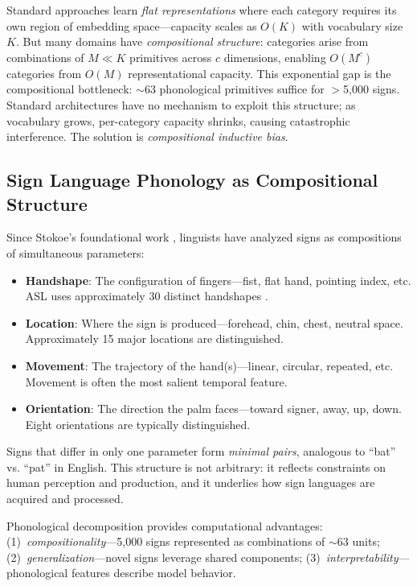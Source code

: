 \documentclass[runningheads]{llncs}
\begin{document}
Standard approaches learn \textit{flat representations} where each category requires its own region of embedding space---capacity scales as $O(K)$ with vocabulary size $K$. But many domains have \textit{compositional structure}: categories arise from combinations of $M \ll K$ primitives across $c$ dimensions, enabling $O(M^c)$ categories from $O(M)$ representational capacity. This exponential gap is the compositional bottleneck: $\sim$63 phonological primitives suffice for $>$5,000 signs. Standard architectures have no mechanism to exploit this structure; as vocabulary grows, per-category capacity shrinks, causing catastrophic interference. The solution is \textit{compositional inductive bias}.

\subsection{Sign Language Phonology as Compositional Structure}

Since Stokoe's foundational work \cite{stokoe1960sign}, linguists have analyzed signs as compositions of simultaneous parameters:
\begin{itemize}[nosep,topsep=2pt]
\item \textbf{Handshape}: The configuration of fingers---fist, flat hand, pointing index, etc. ASL uses approximately 30 distinct handshapes \cite{battison1978lexical}.
\item \textbf{Location}: Where the sign is produced---forehead, chin, chest, neutral space. Approximately 15 major locations are distinguished.
\item \textbf{Movement}: The trajectory of the hand(s)---linear, circular, repeated, etc. Movement is often the most salient temporal feature.
\item \textbf{Orientation}: The direction the palm faces---toward signer, away, up, down. Eight orientations are typically distinguished.
\end{itemize}

Signs that differ in only one parameter form \textit{minimal pairs}, analogous to ``bat'' vs. ``pat'' in English. This structure is not arbitrary: it reflects constraints on human perception and production, and it underlies how sign languages are acquired and processed.

Phonological decomposition provides computational advantages: (1)~\textit{compositionality}---5,000 signs represented as combinations of $\sim$63 units; (2)~\textit{generalization}---novel signs leverage shared components; (3)~\textit{interpretability}---phonological features describe model behavior.
\end{document}

